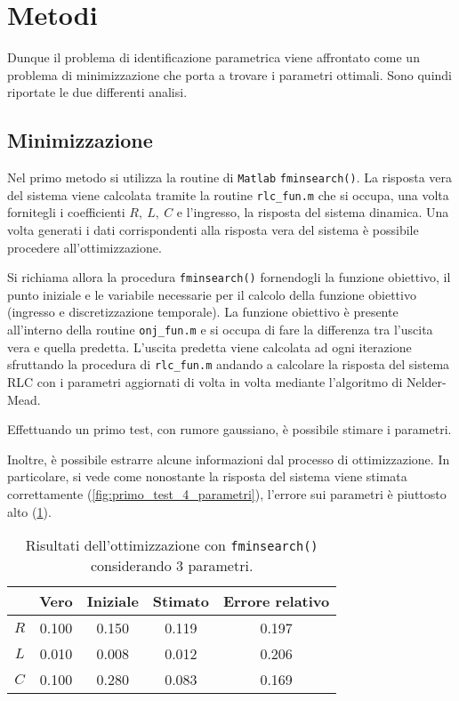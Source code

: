 \section{Metodi}

Dunque il problema di identificazione parametrica viene affrontato come un problema di minimizzazione che porta a trovare i parametri ottimali. Sono quindi riportate le due differenti analisi.


\subsection{Minimizzazione}

Nel primo metodo si utilizza la routine di \texttt{Matlab} \texttt{fminsearch()}. La risposta vera del sistema viene calcolata tramite la routine \texttt{rlc\_fun.m} che si occupa, una volta fornitegli i coefficienti $R,\:L,\:C$ e l'ingresso, la risposta del sistema dinamica. Una volta generati i dati corrispondenti alla risposta vera del sistema è possibile procedere all'ottimizzazione. 

Si richiama allora la procedura \texttt{fminsearch()} fornendogli la funzione obiettivo, il punto iniziale e le variabile necessarie per il calcolo della funzione obiettivo (ingresso e discretizzazione temporale). La funzione obiettivo è presente all'interno della routine \texttt{onj\_fun.m} e si occupa di fare la differenza tra l'uscita vera e quella predetta. L'uscita predetta viene calcolata ad ogni iterazione sfruttando la procedura di \texttt{rlc\_fun.m} andando a calcolare la risposta del sistema RLC con i parametri aggiornati di volta in volta mediante l'algoritmo di Nelder-Mead. 

Effettuando un primo test, con rumore gaussiano, è possibile stimare i parametri. 

Inoltre, è possibile estrarre alcune informazioni dal processo di ottimizzazione. In particolare, si vede come nonostante la risposta del sistema viene stimata correttamente (\cref{fig:primo_test_4_parametri}), l'errore sui parametri è piuttosto alto (\cref{tab:test_3_param}).

\begin{table}[bt]
\begin{tabular}{|c|c|c|c|c|}
	\hline
	& Vero & Iniziale & Stimato & Errore relativo \\
	\hline
	$R$ & 0.100 & 0.150 & 0.119 & 0.197 \\
	\hline
	$L$ &  0.010 & 0.008 & 0.012 & 0.206 \\
	\hline
	$C$ & 0.100 & 0.280 & 0.083 & 0.169 \\
	\hline
\end{tabular}
\caption{Risultati dell'ottimizzazione con \texttt{fminsearch()} considerando 3 parametri.}
\label{tab:test_3_param}
\end{table}

